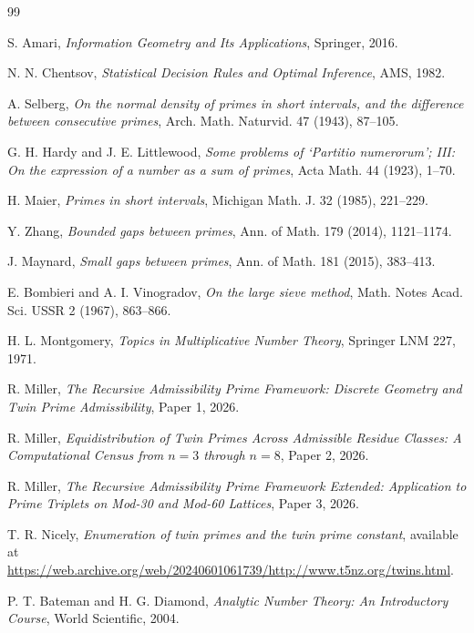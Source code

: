 \documentclass[11pt]{article}
\theoremstyle{remark}
\begin{document}
\begin{thebibliography}{99}

S. Amari, \emph{Information Geometry and Its Applications}, Springer, 2016.

N. N. Chentsov, \emph{Statistical Decision Rules and Optimal Inference},
AMS, 1982.

A. Selberg, \emph{On the normal density of primes in short intervals,
and the difference between consecutive primes}, Arch. Math. Naturvid.
47 (1943), 87--105.

G. H. Hardy and J. E. Littlewood, \emph{Some problems of `Partitio numerorum';
III: On the expression of a number as a sum of primes}, Acta Math. 44 (1923),
1--70.

H. Maier, \emph{Primes in short intervals}, Michigan Math. J. 32 (1985),
221--229.

Y. Zhang, \emph{Bounded gaps between primes}, Ann. of Math. 179 (2014),
1121--1174.

J. Maynard, \emph{Small gaps between primes}, Ann. of Math. 181 (2015),
383--413.

E. Bombieri and A. I. Vinogradov, \emph{On the large sieve method},
Math. Notes Acad. Sci. USSR 2 (1967), 863--866.

H. L. Montgomery, \emph{Topics in Multiplicative Number Theory},
Springer LNM 227, 1971.

R. Miller, \emph{The Recursive Admissibility Prime Framework: Discrete
Geometry and Twin Prime Admissibility}, Paper 1, 2026.

R. Miller, \emph{Equidistribution of Twin Primes Across Admissible
Residue Classes: A Computational Census from $n = 3$ through $n = 8$},
Paper 2, 2026.

R. Miller, \emph{The Recursive Admissibility Prime Framework Extended:
Application to Prime Triplets on Mod-30 and Mod-60 Lattices},
Paper 3, 2026.

T. R. Nicely, \emph{Enumeration of twin primes and the twin prime
constant}, available at
\url{https://web.archive.org/web/20240601061739/http://www.t5nz.org/twins.html}.

P. T. Bateman and H. G. Diamond, \emph{Analytic Number Theory:
An Introductory Course}, World Scientific, 2004.

\end{thebibliography}
\end{document}

